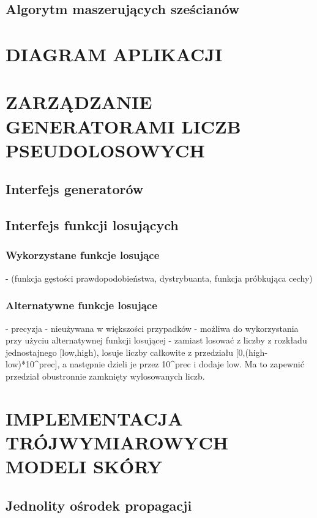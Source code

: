 \section{Algorytm maszerujących sześcianów}



\chapter{DIAGRAM APLIKACJI}
\label{chpt:diagram-aplikacji}



\chapter{ZARZĄDZANIE GENERATORAMI LICZB PSEUDOLOSOWYCH}
\label{chpt:zarządzanie-generatorami-liczb-pseudolosowych}
\section{Interfejs generatorów}
\section{Interfejs funkcji losujących}
\subsection{Wykorzystane funkcje losujące}
- (funkcja gęstości prawdopodobieństwa, dystrybuanta, funkcja próbkująca cechy)
\subsection{Alternatywne funkcje losujące}

- precyzja
- nieużywana w większości przypadków
- możliwa do wykorzystania przy użyciu alternatywnej funkcji losującej
- zamiast losować z liczby z rozkładu jednostajnego [low,high), losuje liczby całkowite z przedziału [0,(high-low)*10^prec], a następnie dzieli je przez 10^prec i dodaje low. Ma to zapewnić przedział obustronnie zamknięty wylosowanych liczb.



\chapter{IMPLEMENTACJA TRÓJWYMIAROWYCH MODELI SKÓRY}
\label{chpt:implementacja-trójwymiarowych-modeli-skóry}
\section{Jednolity ośrodek propagacji}
